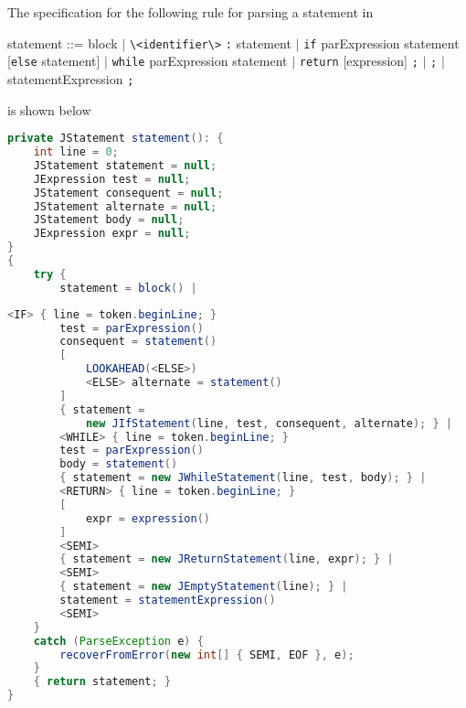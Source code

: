 \documentclass[8pt,a4paper,compress]{beamer}
\newcommand{\mm}[1]{$#1$}
\newenvironment{spaced}
{
\smallskip
\hspace{.5cm}
\begin{minipage}[c]{\textwidth}
}
{
\end{minipage}
\smallskip
}
\begin{document}
\begin{frame}[fragile]
\pause

The specification for the following rule for parsing a statement in \jmm

\text{ }
\begin{spaced}
\begin{production}
statement ::= block
                  \mm{|} \lstinline{\<identifier\>} \lstinline{:} statement
                  \mm{|} \lstinline{if} parExpression statement [\lstinline{else} statement]
                  \mm{|} \lstinline{while} parExpression statement
                  \mm{|} \lstinline{return} [expression] \lstinline{;}
                  \mm{|} \lstinline{;}
                  \mm{|} statementExpression \lstinline{;}
\end{production}
\end{spaced}

\noindent is shown below

\begin{lstlisting}[language=Java]
private JStatement statement(): {
    int line = 0;
    JStatement statement = null;
    JExpression test = null;
    JStatement consequent = null;
    JStatement alternate = null;
    JStatement body = null;
    JExpression expr = null;
}
{
    try {
        statement = block() |
\end{lstlisting}
\end{frame}

\begin{frame}[fragile]
\pause

\begin{lstlisting}[language=Java]
        <IF> { line = token.beginLine; }
        test = parExpression()
        consequent = statement()
        [
            LOOKAHEAD(<ELSE>)
            <ELSE> alternate = statement()
        ]
        { statement =
            new JIfStatement(line, test, consequent, alternate); } |
        <WHILE> { line = token.beginLine; }
        test = parExpression()
        body = statement()
        { statement = new JWhileStatement(line, test, body); } |
        <RETURN> { line = token.beginLine; }
        [
            expr = expression()
        ]
        <SEMI>
        { statement = new JReturnStatement(line, expr); } |
        <SEMI>
        { statement = new JEmptyStatement(line); } |
        statement = statementExpression()
        <SEMI>
    }
    catch (ParseException e) {
        recoverFromError(new int[] { SEMI, EOF }, e);
    }
    { return statement; }
}
\end{lstlisting}
\end{frame}
\end{document}
